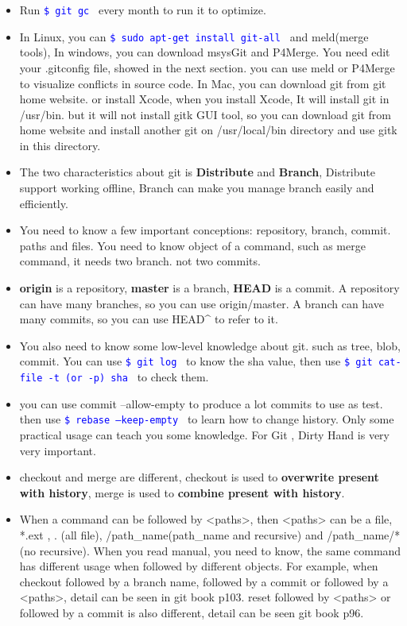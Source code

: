 \documentclass[a4paper,12pt,twoside]{book}
\newcommand{\linuxcommand}[1]{\texttt{\textcolor{blue}{\$ #1 \Pisymbol{psy}{191}}}}
\begin{document}
\begin{itemize}
\begin{itemize}
 \item Run \linuxcommand{git gc} every month to run it to optimize.

 \item In Linux, you can \linuxcommand{sudo apt-get install git-all} and meld(merge tools), In windows, you can download msysGit and P4Merge. You need edit your .gitconfig file, showed in the next section. you can use meld or P4Merge to visualize conflicts in source code. In Mac, you can download git from git home website. or install Xcode, when you install Xcode, It will install git in /usr/bin. but it will not install gitk GUI tool, so you can download git from home website and install another git on /usr/local/bin directory and use gitk in this directory. 

\item The two characteristics about git is \textbf{Distribute} and \textbf{Branch}, Distribute support working offline, Branch can make you manage branch easily and efficiently.

\item You need to know a few important conceptions: repository, branch, commit.  paths and files. You need to know object of a command, such as merge command, it needs two branch. not two commits. 
   
	\item \textbf{origin} is a repository, \textbf{master} is a branch, \textbf{HEAD} is a commit. A repository can have many branches, so you can use origin/master. A branch can have many commits, so you can use HEAD\^{} to refer to it.
    
 \item You also need to know some low-level knowledge about git. such as tree, blob,  commit. You can use \linuxcommand{git log} to know the sha value, then use \linuxcommand{git cat-file -t (or -p) sha} to check them. 
    
    \item you can use commit --allow-empty to produce a lot commits to use as test. then use
        \linuxcommand{rebase --keep-empty } to learn how to change history. Only some practical usage can teach you some knowledge. For Git , Dirty Hand is very very important.
        
        \item checkout and merge are different, checkout is used to \textbf{overwrite present with history}, merge is used to \textbf{combine present with history}.
        
         \item When a command can be followed by <paths>, then <paths> can be a file, *.ext ,  . (all file),  /path\_name(path\_name and recursive) and /path\_name/*(no recursive).  When you read manual, you need to know, the same command has different usage when followed by different objects. For example, when checkout followed by a branch name, followed by a commit or followed by a <paths>, detail can be seen in git book p103.  reset followed by <paths> or followed by a commit is also different, detail can be seen git book p96. 
         

\end{itemize}
\end{itemize}
\end{document}
